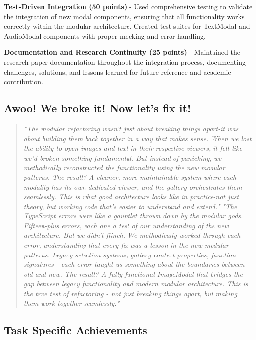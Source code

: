 \documentclass[11pt]{article}
\begin{document}
\textbf{Test-Driven Integration (50 points)} - Used comprehensive testing to validate the integration of new modal components, ensuring that all functionality works correctly within the modular architecture. Created test suites for TextModal and AudioModal components with proper mocking and error handling.

\textbf{Documentation and Research Continuity (25 points)} - Maintained the research paper documentation throughout the integration process, documenting challenges, solutions, and lessons learned for future reference and academic contribution.

\subsection{Awoo! We broke it! Now let's fix it!}

\begin{quote}
\textit{"The modular refactoring wasn't just about breaking things apart-it was about building them back together in a way that makes sense. When we lost the ability to open images and text in their respective viewers, it felt like we'd broken something fundamental. But instead of panicking, we methodically reconstructed the functionality using the new modular patterns. The result? A cleaner, more maintainable system where each modality has its own dedicated viewer, and the gallery orchestrates them seamlessly. This is what good architecture looks like in practice-not just theory, but working code that's easier to understand and extend."}
\textit{"The TypeScript errors were like a gauntlet thrown down by the modular gods. Fifteen-plus errors, each one a test of our understanding of the new architecture. But we didn't flinch. We methodically worked through each error, understanding that every fix was a lesson in the new modular patterns. Legacy selection systems, gallery context properties, function signatures - each error taught us something about the boundaries between old and new. The result? A fully functional ImageModal that bridges the gap between legacy functionality and modern modular architecture. This is the true test of refactoring - not just breaking things apart, but making them work together seamlessly."}
\end{quote}

\subsection{Task Specific Achievements}
\end{document}
